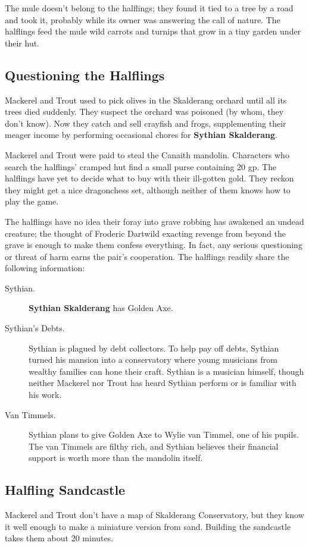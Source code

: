 \documentclass[10pt,a4paper,twoside,bg=print,twocolumn,openany,nodeprecatedcode]{dndbook}
\begin{document}
The mule doesn't belong to the halflings; they found it tied to a tree by a road and took it, probably while its owner was answering the call of nature. The halflings feed the mule wild carrots and turnips that grow in a tiny garden under their hut.

\subsection{Questioning the Halflings}
Mackerel and Trout used to pick olives in the Skalderang orchard until all its trees died suddenly. They suspect the orchard was poisoned (by whom, they don't know). Now they catch and sell crayfish and frogs, supplementing their meager income by performing occasional chores for \textbf{Sythian Skalderang}.

Mackerel and Trout were paid to steal the Canaith mandolin. Characters who search the halflings' cramped hut find a small purse containing 20 gp. The halflings have yet to decide what to buy with their ill-gotten gold. They reckon they might get a nice dragonchess set, although neither of them knows how to play the game.

The halflings have no idea their foray into grave robbing has awakened an undead creature; the thought of Froderic Dartwild exacting revenge from beyond the grave is enough to make them confess everything. In fact, any serious questioning or threat of harm earns the pair's cooperation. The halflings readily share the following information:


\begin{description}
\item[Sythian.]
\textbf{Sythian Skalderang} has Golden Axe.
\item[Sythian's Debts.]
Sythian is plagued by debt collectors. To help pay off debts, Sythian turned his mansion into a conservatory where young musicians from wealthy families can hone their craft. Sythian is a musician himself, though neither Mackerel nor Trout has heard Sythian perform or is familiar with his work.
\item[Van Timmels.]
Sythian plans to give Golden Axe to Wylie van Timmel, one of his pupils. The van Timmels are filthy rich, and Sythian believes their financial support is worth more than the mandolin itself.
\end{description}

\subsection{Halfling Sandcastle}
Mackerel and Trout don't have a map of Skalderang Conservatory, but they know it well enough to make a miniature version from sand. Building the sandcastle takes them about 20 minutes.
\end{document}
